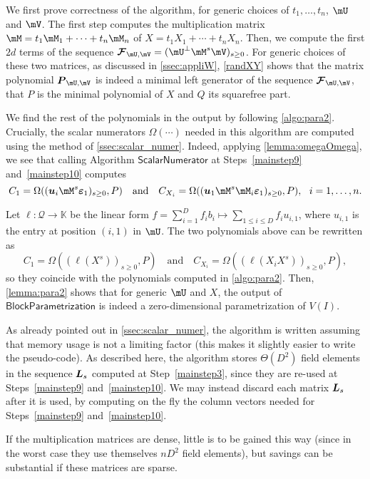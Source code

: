 \documentclass[12pt]{article}
\newcommand{\mat}[1]{\bm{\MakeUppercase{#1}}} %
\newcommand{\row}[1]{\bm{\MakeLowercase{#1}}} %
\newcommand{\col}[1]{\bm{\MakeLowercase{#1}}} %
\newcommand{\seq}{\mat{\mathcal{F}}} %
\newcommand{\minpoly}{P}
\newcommand{\mainalgoname}{\mathsf{ BlockParametrization}}
\newcommand{\lf}{X}
\newcommand{\residueI}{\mathscr{Q}}
\newcommand{\sqfree}{Q}
\def\K{\mathbb{K}}
\def\K {\ensuremath{\mathbb{K}}}
\begin{document}
We first prove correctness of the algorithm, for generic choices of
$t_1,\dots,t_n$, $\mU$ and $\mV$. The first step computes the
multiplication matrix $\mM=t_1 \mM_1 + \cdots + t_n \mM_n$ of $\lf=t_1
X_1 + \cdots + t_n X_n$.
Then, we compute the first $2d$ terms of the sequence $\seq_{\mU,\mV}=
(\mU^{\perp}\mM^s\mV)_{s\ge 0}$. For generic choices of these two
matrices, as discussed in \cref{ssec:appliW}, \cref{randXY} shows that
the matrix polynomial $\mat{P}_{\mU,\mV}$ is indeed a minimal left
generator of the sequence $\seq_{\mU,\mV}$, that $\minpoly$ is the minimal 
polynomial of $\lf$ and $\sqfree$ its squarefree part.

We find the rest of the polynomials in the output by following
\cref{algo:para2}. Crucially, the scalar numerators $\Omega(\cdots)$
needed in this algorithm are computed using the method of
\cref{ssec:scalar_numer}. Indeed, applying  \cref{lemma:omegaOmega},
we see that calling  Algorithm $\mathsf{ ScalarNumerator}$
at Steps~\ref{mainstep9} and~\ref{mainstep10}
computes $$C_1 = \Omega((\row{u}_i \mM^s \col{\varepsilon}_1)_{s \ge
  0}, \minpoly) \quad\text{and}\quad C_{X_i} = \Omega((\row{u}_1 \mM^s
\mM_i \col{\varepsilon}_1)_{s \ge 0}, \minpoly),\ \ i=1,\dots,n.$$ 

Let $\ell:\residueI \to \K$ be the linear form $f = \sum_{i=1}^D f_i b_i \mapsto 
\sum_{1 \le i \le D} f_i u_{i,1}$, where $u_{i,1}$ is the entry at position
$(i,1)$ in $\mU$. The two polynomials above can be rewritten
as 
$$C_1 = \Omega( (\ell(X^s))_{s \ge 0}, \minpoly) \quad\text{and}\quad
C_{X_i} = \Omega( (\ell(X_i X^s))_{s \ge 0}, \minpoly),$$ so they
coincide with the polynomials computed in \cref{algo:para2}.  Then,
\cref{lemma:para2} shows that for generic $\mU$ and $\lf$, the output
of $\mainalgoname$
is indeed a zero-dimensional parametrization of $V(I)$.  

\begin{remark}
  As already pointed out in \cref{ssec:scalar_numer}, the algorithm is
  written assuming that memory usage is not a limiting factor (this
  makes it slightly easier to write the pseudo-code). As described
  here, the algorithm stores $\Theta(D^2)$ field elements in the
  sequence $\mat{L}_s$ computed at Step~\ref{mainstep3}, since they
  are re-used at Steps~\ref{mainstep9} and~\ref{mainstep10}.  We may
  instead discard each matrix $\mat{L}_s$ after it is used, by
  computing on the fly the column vectors needed for Steps~\ref{mainstep9}
  and~\ref{mainstep10}.

  If the multiplication matrices are dense, little is to be gained
  this way (since in the worst case they use themselves $n D^2$ field elements),
  but savings can be substantial if these  matrices are sparse.
\end{remark}
\end{document}
